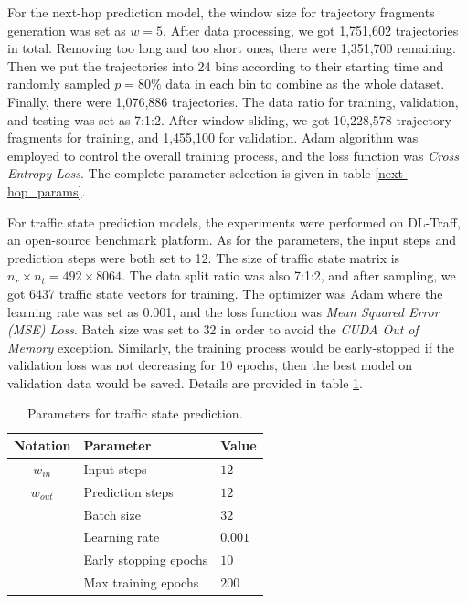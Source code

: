 For the next-hop prediction model, the window size for trajectory fragments generation was set as $w=5$. After data processing, we got 1,751,602 trajectories in total. Removing too long and too short ones, there were 1,351,700 remaining. Then we put the trajectories into 24 bins according to their starting time and randomly sampled $p=80\%$ data in each bin to combine as the whole dataset. Finally, there were 1,076,886 trajectories. The data ratio for training, validation, and testing was set as 7:1:2. After window sliding, we got 10,228,578 trajectory fragments for training, and 1,455,100 for validation. Adam\cite{adam} algorithm was employed to control the overall training process, and the loss function was \textit{Cross Entropy Loss}. The complete parameter selection is given in table \ref{next-hop_params}.

For traffic state prediction models, the experiments were performed on DL-Traff\cite{dl-traff}, an open-source benchmark platform. As for the parameters, the input steps and prediction steps were both set to 12. The size of traffic state matrix is $n_r\times n_t=492\times 8064$. The data split ratio was also 7:1:2, and after sampling, we got 6437 traffic state vectors for training. The optimizer was Adam where the learning rate was set as 0.001, and the loss function was \textit{Mean Squared Error (MSE) Loss}. Batch size was set to 32 in order to avoid the \textit{CUDA Out of Memory} exception. Similarly, the training process would be early-stopped if the validation loss was not decreasing for 10 epochs, then the best model on validation data would be saved. Details are provided in table \ref{traff_pred_params}.

\begin{table}[htb]
    \begin{center}
        \caption{Parameters for traffic state prediction.}
        \label{traff_pred_params}
        \begin{tabular}{cll}
            \toprule

            \textbf{Notation} & \textbf{Parameter}    & \textbf{Value} \\

            \midrule

            $w_{in}$          & Input steps           & $12$           \\
            $w_{out}$         & Prediction steps      & $12$           \\
            ~                 & Batch size            & $32$           \\
            ~                 & Learning rate         & $0.001$        \\
            ~                 & Early stopping epochs & $10$           \\
            ~                 & Max training epochs   & $200$          \\

            \bottomrule
        \end{tabular}
    \end{center}
\end{table}

